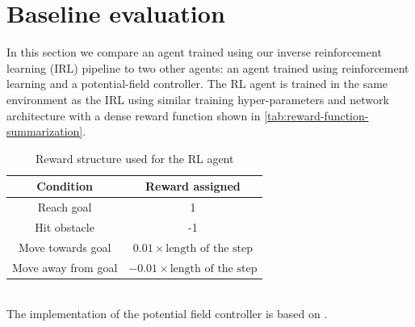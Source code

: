 \section{Baseline evaluation}
\label{sec:baseline-evaluation}
In this section we compare an agent trained using our inverse reinforcement learning (IRL) pipeline to two other agents: an agent trained using reinforcement learning and a potential-field controller. The RL agent is trained in the same environment as the IRL using similar training hyper-parameters and network architecture with a dense reward function shown in \autoref{tab:reward-function-summarization}.
\begin{table}[htbp]
    \caption{Reward structure used for the RL agent}
    \begin{center}
        \renewcommand{\arraystretch}{1.3}
        \begin{tabular}{|c|c|}
        \hline
        Condition & Reward assigned \\
        \hline
        Reach goal & 1 \\
        Hit obstacle & -1 \\
        Move towards goal & $0.01 \times \text{length of the step}$ \\
        Move away from goal & $ -0.01 \times \text{length of the step}$\\
        \hline
        \end{tabular}
    \end{center}
    \label{tab:reward-function-summarization}
\end{table}\\
The implementation of the potential field controller is based on \cite{khatib_1986}.\\  
